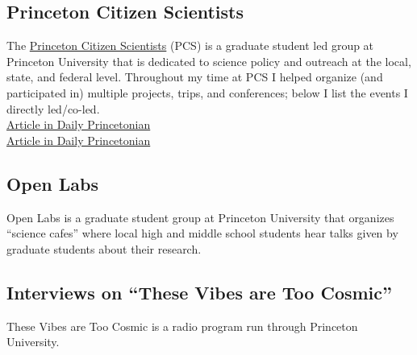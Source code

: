 \documentclass{my_cv}
\begin{document}
\subsection{Princeton Citizen Scientists}
	The \href{https://citizenscientists.princeton.edu/}{Princeton Citizen Scientists} 
(PCS) is a graduate student led group
at Princeton University that is dedicated to science policy and
outreach at the local, state, and federal level.
Throughout my time at PCS I helped
organize (and participated in) multiple projects, trips, and conferences;
below I list the events I directly led/co-led. 
\indentline
{}
\indentline
{}
   \\\indent
   \href{http://www.dailyprincetonian.com/article/2019/01/justin-ripley-q-and-a}{
      Article in Daily Princetonian
   }
\indentline
{}
   \\\indent
   \href{http://www.dailyprincetonian.com/article/2017/10/princeton-citizen-scientists-host-teach-in-at-princeton-public-library}{
      Article in Daily Princetonian
   }
\subsection{Open Labs}
	Open Labs is a graduate student group at Princeton University
that organizes ``science cafes''
where local high and middle school students hear talks given by graduate
students about their research.
\indentline
{}
\subsection{Interviews on ``These Vibes are Too Cosmic''}
	These Vibes are Too Cosmic is a radio program run through
	Princeton University.
\begin{itemize}
\end{itemize}
\end{document}
